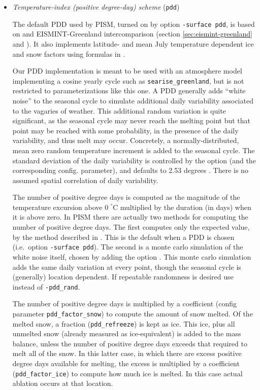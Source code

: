 \begin{itemize}
 \item \emph{Temperature-index (positive degree-day) scheme} (\texttt{pdd})     

   The default PDD used by PISM, turned on by option \texttt{-surface pdd}, is based on \cite{CalovGreve05} and EISMINT-Greenland intercomparison (section \ref{sec:eismint-greenland} and \cite{RitzEISMINT}).  It also implements latitude- and mean July temperature dependent ice and snow factors using formulas in \cite{Faustoetal2009}.

   Our PDD implementation is meant to be used with an atmosphere model implementing a cosine yearly cycle such as \texttt{searise_greenland}, but is not restricted to parameterizations like this one. A PDD generally adds ``white noise'' to the seasonal cycle to simulate additional daily variability associated to the vagaries of weather.  This additional random variation is quite significant, as the seasonal cycle may never reach the melting point but that point may be reached with some probability, in the presence of the daily variability, and thus melt may occur.  Concretely, a normally-distributed, mean zero random temperature increment is added to the seasonal cycle.  The standard deviation of the daily variability is controlled by the  option (and the corresponding config. parameter), and defaults to 2.53 degrees \cite{Faustoetal2009}. There is no assumed spatial correlation of daily variability.

The number of positive degree days is computed as the magnitude of the temperature excursion above $0\!\phantom{|}^\circ \text{C}$ multiplied by the duration (in days) when it is above zero.  In PISM there are actually two methods for computing the number of positive degree days.  The first computes only the expected value, by the method described in \cite{CalovGreve05}.  This is the default when a PDD is chosen (i.e.~option \texttt{-surface pdd}).  The second is a monte carlo simulation of the white noise itself, chosen by adding the option .  This monte carlo simulation adds the same daily variation at every point, though the seasonal cycle is (generally) location dependent.  If repeatable randomness is desired use  instead of \texttt{-pdd_rand}.

The number of positive degree days is multiplied by a coefficient (config parameter \texttt{pdd_factor_snow}) to compute the amount of snow melted.  Of the melted snow, a fraction (\texttt{pdd_refreeze}) is kept as ice.  This ice, plus all unmelted snow (already measured as ice-equivalent) is added to the mass balance, unless the number of positive degree days exceeds that required to melt all of the snow.  In this latter case, in which there are excess positive degree days available for melting, the excess is multiplied by a coefficient (\texttt{pdd_factor_ice}) to compute how much ice is melted.  In this case actual ablation occurs at that location.


\end{itemize}
